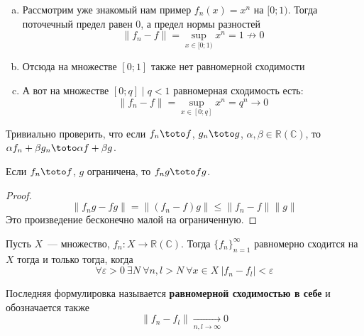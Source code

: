 \documentclass{article}
\let\eps\varepsilon
\begin{document}
    \begin{example}
        \begin{enumerate}[a)]
            \item Рассмотрим уже знакомый нам пример $f_n(x)=x^n$ на $[0;1)$. Тогда поточечный предел равен $0$, а предел нормы разностей
            $$\|f_n-f\|=\sup\limits_{x\in[0;1)}x^n=1\not\rightarrow0$$
            \item Отсюда на множестве $[0;1]$ также нет равномерной сходимости
            \item А вот на множестве $[0;q]\mid q<1$ равномерная сходимость есть:
            $$\|f_n-f\|=\sup\limits_{x\in[0;q]}x^n=q^n\rightarrow0$$
        \end{enumerate}
    \end{example}
    \addtocounter{property}{-1}
    \begin{property}
        Тривиально проверить, что если $f_n\toto f$, $g_n\toto g$, $\alpha,\beta\in\mathbb R(\mathbb C)$, то $\alpha f_n+\beta g_n\toto\alpha f+\beta g$.
    \end{property}
    \begin{property}
        \label{Произведение равномерно сходящейся на ограниченную}
        Если $f_n\toto f$, $g$ ограничена, то $f_ng\toto fg$.
    \end{property}
    \begin{proof}
        $$\|f_ng-fg\|=\|(f_n-f)g\|\leqslant\|f_n-f\|\|g\|$$
        Это произведение бесконечно малой на ограниченную.
    \end{proof}
    \begin{theorem}
        \label{Б-К для функциональных последовательностей}
        Пусть $X$~--- множество, $f_n\colon X\to\mathbb R(\mathbb C)$. Тогда $\{f_n\}_{n=1}^\infty$ равномерно сходится на $X$ тогда и только тогда, когда
        $$
        \forall\eps>0~\exists N~\forall n,l>N~\forall x\in X~|f_n-f_l|<\eps
        $$
    \end{theorem}
    \begin{definition}
        Последняя формулировка называется \textbf{равномерной сходимостью в себе} и обозначается также
        $$
        \|f_n-f_l\|\underset{n,l\to\infty}\longrightarrow0
        $$
    \end{definition}
\end{document}

